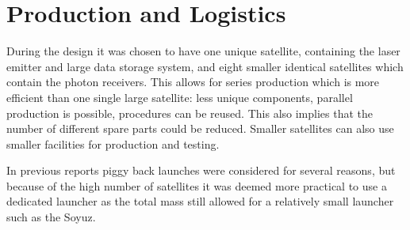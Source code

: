 \section{Production and Logistics}
\label{SSPRO}

During the design it was chosen to have one unique satellite, containing the laser emitter and large data storage system, and eight smaller identical satellites which contain the photon receivers. This allows for series production which is more efficient than one single large satellite: less unique components, parallel production is possible, procedures can be reused. This also implies that the number of different spare parts could be reduced. Smaller satellites can also use smaller facilities for production and testing. 

In previous reports piggy back launches were considered for several reasons, but because of the high number of satellites it was deemed more practical to use a dedicated launcher as the total mass still allowed for a relatively small launcher such as the Soyuz.